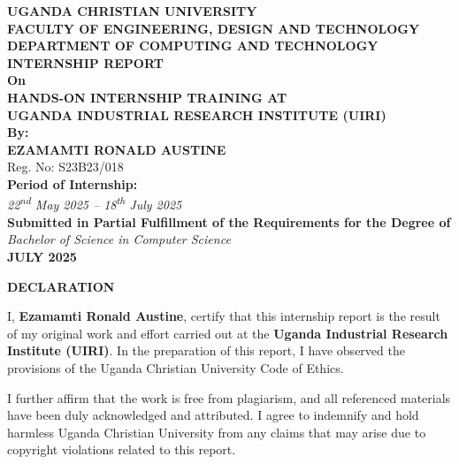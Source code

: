 \documentclass[12pt,a4paper]{report}
\begin{document}

\begin{titlepage}
    \centering
    {\large \textbf{UGANDA CHRISTIAN UNIVERSITY}}\\[1.5cm]
    {\large \textbf{FACULTY OF ENGINEERING, DESIGN AND TECHNOLOGY}}\\[0.5cm]
    {\large \textbf{DEPARTMENT OF COMPUTING AND TECHNOLOGY}}\\[2cm]
    {\LARGE \textbf{INTERNSHIP REPORT}}\\[0.5cm]
    \textbf{On} \\[0.3cm]
    {\Large \textbf{HANDS-ON INTERNSHIP TRAINING AT}}\\[0.3cm]
    {\Large \textbf{UGANDA INDUSTRIAL RESEARCH INSTITUTE (UIRI)}}\\[1.5cm]

    \textbf{By:} \\[0.3cm]
    {\Large \textbf{EZAMAMTI RONALD AUSTINE}}\\
    {\large Reg. No: S23B23/018}\\[2cm]

    \textbf{Period of Internship:} \\[0.2cm]
    \textit{22\textsuperscript{nd} May 2025 – 18\textsuperscript{th} July 2025}\\[2cm]

    \textbf{Submitted in Partial Fulfillment of the Requirements for the Degree of} \\
    \textit{Bachelor of Science in Computer Science}\\[1.5cm]

    \textbf{JULY 2025}
\end{titlepage}

{\fontsize{14}{16.8}\selectfont\bfseries\centering DECLARATION\par}
\vspace{10pt}
\noindent I, \textbf{Ezamamti Ronald Austine}, certify that this internship report is the result of my original work and effort carried out at the \textbf{Uganda Industrial Research Institute (UIRI)}. In the preparation of this report, I have observed the provisions of the Uganda Christian University Code of Ethics.

\noindent I further affirm that the work is free from plagiarism, and all referenced materials have been duly acknowledged and attributed. I agree to indemnify and hold harmless Uganda Christian University from any claims that may arise due to copyright violations related to this report.
\end{document}
